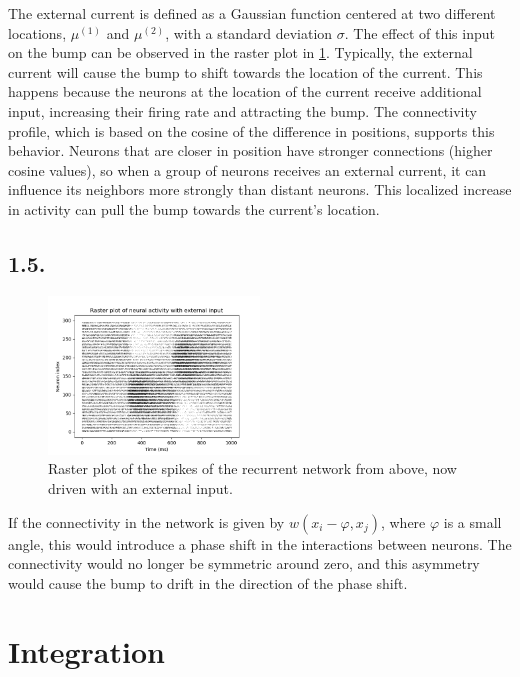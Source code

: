 \documentclass{article}
\begin{document}
The external current is defined as a Gaussian function centered at two different locations, \( \mu^{(1)} \) and \( \mu^{(2)} \), with a standard deviation \( \sigma \).
The effect of this input on the bump can be observed in the raster plot in \cref{fig:14}. Typically, the external current will cause the bump to shift towards the location of the current. This happens because the neurons at the location of the current receive additional input, increasing their firing rate and attracting the bump.
The connectivity profile, which is based on the cosine of the difference in positions, supports this behavior. Neurons that are closer in position have stronger connections (higher cosine values), so when a group of neurons receives an external current, it can influence its neighbors more strongly than distant neurons. This localized increase in activity can pull the bump towards the current's location.

\subsection*{1.5.}
\begin{figure}[h]
    \centering
    \includegraphics[width=0.5\textwidth]{figures/1.4.extinput_plot_J5.png}
    \caption{Raster plot of the spikes of the recurrent network from above, now driven with an external input.}
    \label{fig:14}
\end{figure}

If the connectivity in the network is given by \( w(x_i - \varphi, x_j) \), where \( \varphi \) is a small angle, this would introduce a phase shift in the interactions between neurons. The connectivity would no longer be symmetric around zero, and this asymmetry would cause the bump to drift in the direction of the phase shift.



\section{Integration}
\end{document}
